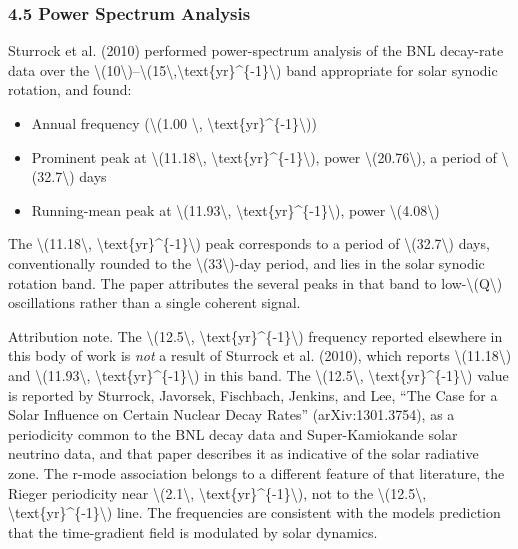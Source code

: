 \documentclass[
  10pt,
]{article}
\providecommand{\tightlist}{%
  \setlength{\itemsep}{0pt}\setlength{\parskip}{0pt}}
\begin{document}
\hypertarget{power-spectrum-analysis}{%
\subsubsection{4.5 Power Spectrum
Analysis}\label{power-spectrum-analysis}}

Sturrock et al. (2010) performed power-spectrum analysis of the BNL
decay-rate data over the
\textbackslash(10\textbackslash)--\textbackslash(15\textbackslash,\textbackslash text\{yr\}\^{}\{-1\}\textbackslash)
band appropriate for solar synodic rotation, and found:

\begin{itemize}
\tightlist
\item
  Annual frequency (\textbackslash(1.00 \textbackslash,
  \textbackslash text\{yr\}\^{}\{-1\}\textbackslash))
\item
  Prominent peak at \textbackslash(11.18\textbackslash,
  \textbackslash text\{yr\}\^{}\{-1\}\textbackslash), power
  \textbackslash(20.76\textbackslash), a period of
  \textbackslash(32.7\textbackslash) days
\item
  Running-mean peak at \textbackslash(11.93\textbackslash,
  \textbackslash text\{yr\}\^{}\{-1\}\textbackslash), power
  \textbackslash(4.08\textbackslash)
\end{itemize}

The \textbackslash(11.18\textbackslash,
\textbackslash text\{yr\}\^{}\{-1\}\textbackslash) peak corresponds to a
period of \textbackslash(32.7\textbackslash) days, conventionally
rounded to the \textbackslash(33\textbackslash)-day period, and lies in
the solar synodic rotation band. The paper attributes the several peaks
in that band to low-\textbackslash(Q\textbackslash) oscillations rather
than a single coherent signal.

Attribution note. The \textbackslash(12.5\textbackslash,
\textbackslash text\{yr\}\^{}\{-1\}\textbackslash) frequency reported
elsewhere in this body of work is \emph{not} a result of Sturrock et al.
(2010), which reports \textbackslash(11.18\textbackslash) and
\textbackslash(11.93\textbackslash,
\textbackslash text\{yr\}\^{}\{-1\}\textbackslash) in this band. The
\textbackslash(12.5\textbackslash,
\textbackslash text\{yr\}\^{}\{-1\}\textbackslash) value is reported by
Sturrock, Javorsek, Fischbach, Jenkins, and Lee, ``The Case for a Solar
Influence on Certain Nuclear Decay Rates'' (arXiv:1301.3754), as a
periodicity common to the BNL decay data and Super-Kamiokande solar
neutrino data, and that paper describes it as indicative of the solar
radiative zone. The r-mode association belongs to a different feature of
that literature, the Rieger periodicity near
\textbackslash(2.1\textbackslash,
\textbackslash text\{yr\}\^{}\{-1\}\textbackslash), not to the
\textbackslash(12.5\textbackslash,
\textbackslash text\{yr\}\^{}\{-1\}\textbackslash) line. The frequencies
are consistent with the model\textquotesingle s prediction that the
time-gradient field is modulated by solar dynamics.
\end{document}
